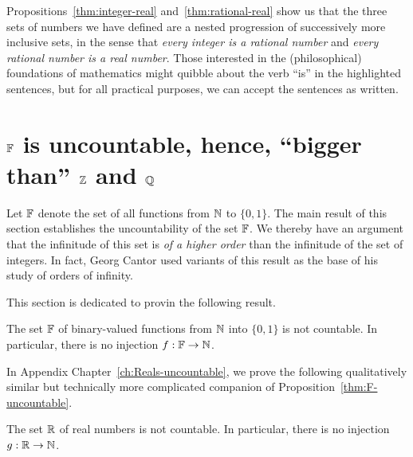 \bigskip

Propositions~\ref{thm:integer-real} and~\ref{thm:rational-real} show
us that the three sets of numbers we have defined are a nested
progression of successively more inclusive sets, in the sense that
{\em every integer is a rational number} and {\em every rational
  number is a real number}.  Those interested in the (philosophical)
foundations of mathematics might quibble about the verb ``is'' in the
highlighted sentences, but for all practical purposes, we can accept
the sentences as written.

\section{$\mathbb{F}$ is uncountable, hence, ``bigger than'' $\mathbb{Z}$ and $\mathbb{Q}$}
\label{sec:Q-Z-F-cardinality}
\label{sec:FNS-uncountable}

Let $\mathbb{F}$ denote the set of all functions from $\mathbb{N}$ to $\{0,1\}$.  The
main result of this section establishes the uncountability of the set
$\mathbb{F}$.  We thereby have an argument that the infinitude of this set is
{\em of a higher order} than the infinitude of the set of integers.
In fact, Georg Cantor used variants of this result as the base of his
study of orders of infinity.

This section is dedicated to provin the following result.

\begin{prop}
\label{thm:F-uncountable}
The set $\mathbb{F}$ of binary-valued functions from $\mathbb{N}$ into $\{0,1\}$ is
not countable.  In particular, there is no injection $f: \mathbb{F}
\rightarrow \mathbb{N}$.
\end{prop}

In Appendix Chapter~\ref{ch:Reals-uncountable}, we prove the following
qualitatively similar but technically more complicated companion of
Proposition~\ref{thm:F-uncountable}.

\begin{prop}
\label{thm:R-uncountable}
The set $\mathbb{R}$ of real numbers is not countable.  In particular, there
is no injection $g: \mathbb{R} \rightarrow \mathbb{N}$.
\end{prop}

